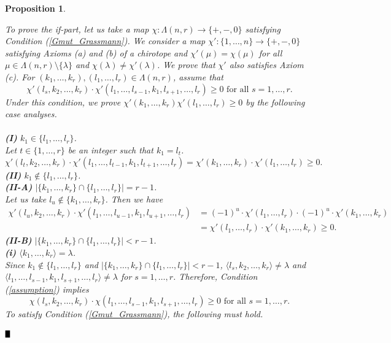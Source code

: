 \documentclass{article}
\def\BBox{\rule{2mm}{3mm}}
\def\QED{\hfill$\BBox$}
\newenvironment{proof}
{\begin{rm}\par\smallskip\noindent{\bf Proof.}\quad}{\QED\end{rm}}
\newtheorem{prop}[thm]{\bfseries Proposition} %
\begin{document}
\begin{prop}
\begin{proof}
To prove the if-part, let us take a map $\chi:\Lambda (n,r) \rightarrow \{ +,-,0\}$  satisfying Condition (\ref{Gmut_Grassmann}).
We consider a map $\chi':\{1,\dots,n\} \rightarrow \{ +,-,0\}$ satisfying Axioms (a) and (b) of a chirotope
and $\chi' (\mu) = \chi (\mu)$ for all $\mu \in \Lambda (n,r) \setminus \{ \lambda \}$ and $\chi (\lambda ) \neq \chi' (\lambda )$.
We prove that $\chi'$ also satisfies Axiom (c).
For $(k_1,\dots,k_r), (l_1,\dots,l_r) \in \Lambda (n,r)$, assume that
\begin{equation}
 \chi' (l_{s},k_{2},\dots,k_{r})\cdot \chi' (l_{1},\dots,l_{s-1},k_{1},l_{s+1},\dots,l_{r}) \geq 0 \text{ for all } s=1,\dots,r. \label{assumption}
\end{equation} 
Under this condition, we prove $\chi' (k_1,\dots,k_r)\chi' (l_1,\dots,l_r) \geq 0$ by the following case analyses.
\\
\\
{\bf (I)} $k_1 \in \{ l_1,\dots,l_r\}$.\\
Let $t \in \{ 1,\dots,r\}$ be an integer such that $k_1 = l_t$.
\[ \chi' (l_{t},k_{2},\dots,k_{r})\cdot \chi' (l_{1},\dots,l_{t-1},k_{1},l_{t+1},\dots,l_{r}) 
= \chi' (k_1,\dots,k_{r})\cdot \chi' (l_{1},\dots,l_{r}) \geq 0. \]
{\bf (II)} $k_1 \notin \{ l_1,\dots,l_r\}$.\\
{\bf (II-A)} $|\{ k_1,\dots,k_r\} \cap \{ l_1,\dots,l_r \} | = r-1$.\\
Let us take $l_u \notin \{ k_1,\dots,k_r \}$. Then we have
\begin{align*}
\chi' (l_{u},k_{2},\dots,k_{r}) \cdot \chi' (l_{1},\dots,l_{u-1},k_{1},l_{u+1},\dots,l_{r}) 
&=  
(-1)^u \cdot \chi' (l_{1},\dots,l_{r}) \cdot (-1)^u \cdot \chi' (k_{1},\dots,k_{r}) \\
&= \chi' (l_{1},\dots,l_{r}) \cdot \chi' (k_{1},\dots,k_{r}) \geq 0. 
\end{align*}
{\bf (II-B)} $|\{ k_1,\dots,k_r\} \cap \{ l_1,\dots,l_r\}| < r-1$.\\
{\bf (i)} $\langle k_1,\dots,k_r \rangle = \lambda$.\\
Since $k_1 \notin \{ l_1,\dots,l_r\}$ and $|\{ k_1,\dots,k_r\} \cap \{ l_1,\dots,l_r\}| < r-1$,
$\langle l_{s},k_{2},\dots,k_{r} \rangle \neq \lambda$ and $\langle l_{1},\dots,l_{s-1},k_{1},l_{s+1},\dots,l_{r} \rangle \neq \lambda$
for $s=1,\dots,r$.
Therefore, Condition (\ref{assumption}) implies
\[ \chi (l_{s},k_{2},\dots,k_{r})\cdot \chi (l_{1},\dots,l_{s-1},k_{1},l_{s+1},\dots,l_{r}) \geq 0 \text{ for all } s=1,\dots,r.\]
To satisfy Condition (\ref{Gmut_Grassmann}), the following must hold.

\end{proof}
\end{prop}
\end{document}
